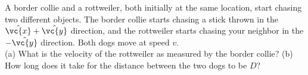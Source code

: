 A border collie and a rottweiler, both initially at the same
location, start chasing two different objects. The border collie
starts chasing a stick thrown in the $\hat{\vc{x}} + \hat{\vc{y}}$ direction, and
the rottweiler starts chasing your neighbor in the $-\hat{\vc{y}}$
direction. Both dogs move at speed $v$.\\
%
(a) What is the velocity of the rottweiler as measured by the border
collie?\answercheck\hwendpart
%
(b) How long does it take for the distance between the two dogs to be
$D$?\answercheck
